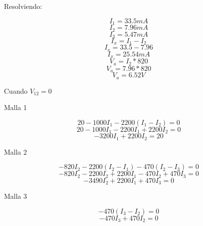 \documentclass[a4paper, 11pt]{article}
\begin{document}
Resolviendo:

\begin{equation*}
I_1=33.5 mA
\end{equation*} 
\begin{equation*}
I_2=7.96 mA
\end{equation*}
\begin{equation*}
I_3=5.47 mA
\end{equation*}
\begin{equation*}
I_x=I_1-I_2
\end{equation*}
\begin{equation*}
I_x=33.5-7.96
\end{equation*}
\begin{equation*}
I_x=25.54 mA
\end{equation*}
\begin{equation*}
V_a=I_2*820
\end{equation*}
\begin{equation*}
V_a=7.96*820
\end{equation*}
\begin{equation*}
V_a=6.52 V
\end{equation*}

Cuando $V_{12}=0$

Malla 1

\begin{equation*}
20-1000I_1-2200(I_1-I_2)=0
\end{equation*}
\begin{equation*}
20-1000I_1-2200I_1+2200I_2=0
\end{equation*}
\begin{equation*}
-3200I_1+2200I_2=20
\end{equation*}

Malla 2

\begin{equation*}
-820I_2-2200(I_2-I_1)-470(I_2-I_3)=0 
\end{equation*}
\begin{equation*}
-820I_2-2200I_2+2200I_1-470I_2+470I_3=0 
\end{equation*}
\begin{equation*}
-3490I_2+2200I_1+470I_3=0
\end{equation*}

Malla 3

\begin{equation*}
-470(I_3-I_2)=0 
\end{equation*}
\begin{equation*}
-470I_3+470I_2=0
\end{equation*}
\end{document}

